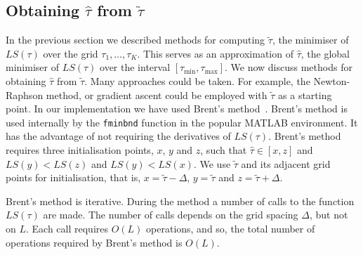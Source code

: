 \documentclass[journal]{IEEEtranTCOM}
\begin{document}







\subsection{Obtaining $\hat{\tau}$ from $\tilde{\tau}$}\label{sec:numerical-refinement}

In the previous section we described methods for computing $\tilde{\tau}$, the minimiser of $LS(\tau)$ over the grid $\tau_1, \dots, \tau_K$.  This serves as an approximation of $\hat{\tau}$, the global minimiser of $LS(\tau)$ over the interval $[\tau_{\text{min}}, \tau_{\text{max}}]$.  We now discuss methods for obtaining $\hat{\tau}$ from $\tilde{\tau}$.  Many approaches could be taken.  For example, the Newton-Raphson method, or gradient ascent could be employed with $\tilde{\tau}$ as a starting point.  In our implementation we have used Brent's method~\cite[Ch.~5]{Brent_opt_no_derivs_1973}\cite[Section 10.2]{numerical_recipes_in_Cpp_2002}.  Brent's method is used internally by the \texttt{fminbnd} function in the popular MATLAB environment.  It has the advantage of not requiring the derivatives of $LS(\tau)$.  Brent's method requires three initialisation points, $x$, $y$ and $z$, such that $\hat{\tau} \in [x,z]$ and $LS(y) < LS(z)$ and $LS(y) < LS(x)$.  We use $\tilde{\tau}$ and its adjacent grid points for initialisation, that is, $x = \tilde{\tau} - \Delta$, $y = \tilde{\tau}$ and $z = \tilde{\tau}+\Delta$.

Brent's method is iterative.  During the method a number of calls to the function $LS(\tau)$ are made.  The number of calls depends on the grid spacing $\Delta$, but not on $L$.  Each call requires $O(L)$ operations, and so, the total number of operations required by Brent's method is $O(L)$.
\end{document}
